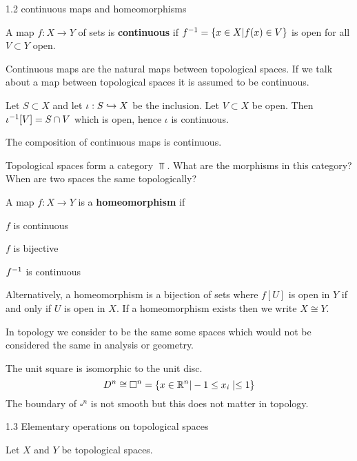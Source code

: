 1.2 continuous maps and homeomorphisms

\begin{defn}
	A map $f: X \to Y$ of sets is \textbf{continuous} if $f^{-1} = \{x \in X | f(x) \in V\}$ is open for all $V \subset Y$ open.
\end{defn}

Continuous maps are the natural maps between topological spaces.
If we talk about a map between topological spaces it is assumed to be continuous.

\begin{exam}
	Let $S \subset X$ and let $\iota: S \hookrightarrow X$ be the inclusion.
	Let $V \subset X$ be open.
	Then $\iota^{-1}[V] = S \cap V$ which is open, hence $\iota$ is continuous.
\end{exam}

\begin{rmk}
	The composition of continuous maps is continuous.
\end{rmk}

\begin{rmk}
	Topological spaces form a category $\Top$.
	What are the morphisms in this category?
	When are two spaces the same topologically?
\end{rmk}

\begin{defn}
	A map $f: X \to Y$ is a \textbf{homeomorphism} if
	\begin{itm}
		\item $f$ is continuous
		\item $f$ is bijective
		\item $f^{-1}$ is continuous
	\end{itm}
	Alternatively, a homeomorphism is a bijection of sets where $f[U]$ is open in $Y$ if and only if $U$ is open in $X$.
	If a homeomorphism exists then we write $X \cong Y$.
\end{defn}

In topology we consider to be the same some spaces which would not be considered the same in analysis or geometry.

\begin{exam}
	The unit square is isomorphic to the unit disc.
	\[D^n \cong \square^n = \{x \in \mathbb{R}^n | -1 \leq x_i \mid \leq 1\}\]
	The boundary of $\square^n$ is not smooth but this does not matter in topology.
\end{exam}

1.3 Elementary operations on topological spaces

Let $X$ and $Y$ be topological spaces.

